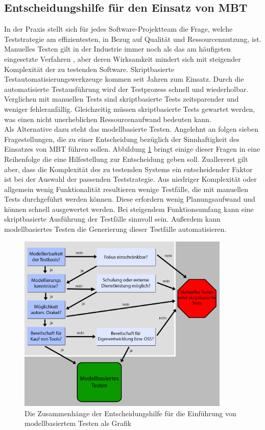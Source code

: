 \subsection{Entscheidungshilfe für den Einsatz von MBT}
\label{sec:entscheidungshilfe}
In der Praxis stellt sich für jedes Software-Projektteam die Frage, welche Teststrategie am effizientesten, in Bezug auf Qualität und Ressourcennutzung, ist. Manuelles Testen gilt in der Industrie immer noch als das am häufigsten eingesetzte Verfahren \cite{guldali_starthilfe_2010}, aber deren Wirksamkeit mindert sich mit steigender Komplexität der zu testenden Software. Skriptbasierte Testautomatisierungswerkzeuge kommen seit Jahren zum Einsatz. Durch die automatisierte Testausführung wird der Testprozess schnell und wiederholbar. Verglichen mit manuellen Tests sind skriptbasierte Tests zeitsparender und weniger fehleranfällig. Gleichzeitig müssen skriptbasierte Tests gewartet werden, was einen nicht unerheblichen Ressourcenaufwand bedeuten kann.\\
Als Alternative dazu steht das modellbasierte Testen. Angelehnt an \citeauthor{guldali_starthilfe_2010} \cite{guldali_starthilfe_2010} folgen sieben Fragestellungen, die zu einer Entscheidung bezüglich der Sinnhaftigkeit des Einsatzes von \Gls{MBT} führen sollen. Abbildung \ref{fig:entscheidungshilfe_mbt} bringt einige dieser Fragen in eine Reihenfolge die eine Hilfestellung zur Entscheidung geben soll. Zuallererst gilt aber, dass die Komplexität des zu testenden Systems ein entscheidender Faktor ist bei der Auswahl der passenden Teststrategie. Aus niedriger Komplexität oder allgemein wenig Funktionalität resultieren wenige Testfälle, die mit manuellen Tests durchgeführt werden können. Diese erfordern wenig Planungsaufwand und können schnell ausgewertet werden. Bei steigendem Funktionsumfang kann eine skriptbasierte Ausführung der Testfälle sinnvoll sein. Außerdem kann modellbasiertes Testen die Generierung dieser Testfälle automatisieren. 

\begin{figure}[h] 
  \centering
     \includegraphics[width=0.9\textwidth]{figures/entscheidungshilfe_mbt.png}
  \caption{Die Zusammenhänge der Entscheidungshilfe für die Einführung von modellbasiertem Testen als Grafik}
  \label{fig:entscheidungshilfe_mbt}
\end{figure}

